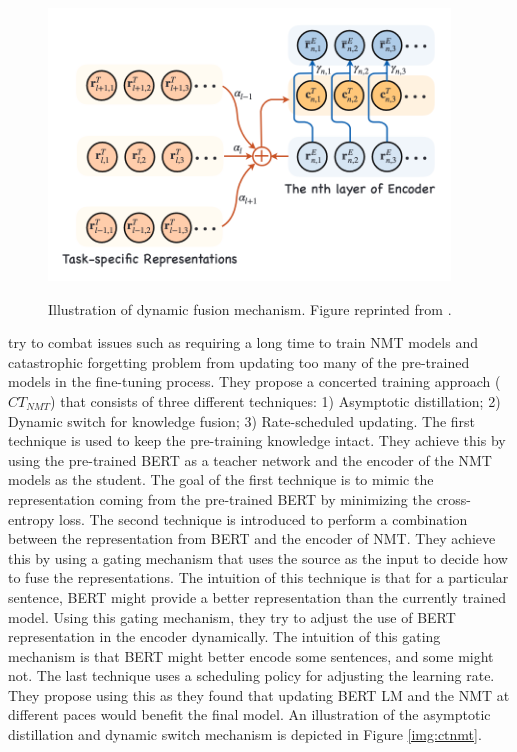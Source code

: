 \begin{figure}[h]
    {\includegraphics[width=0.95\textwidth]{img/dynamic_fusion.png}}
    \centering
    \caption{Illustration of dynamic fusion mechanism. Figure reprinted from \cite{weng2020acquiring}.}
    \label{img:dyn_fn}
\end{figure}

\cite{yang2020towards} try to combat issues such as requiring a long time to train NMT models and catastrophic forgetting problem from updating too many of the pre-trained models in the fine-tuning process. They propose a concerted training approach ($CT_{NMT}$) that consists of three different techniques: 1) Asymptotic distillation; 2) Dynamic switch for knowledge fusion; 3) Rate-scheduled updating. The first technique is used to keep the pre-training knowledge intact. They achieve this by using the pre-trained BERT as a teacher network and the encoder of the NMT models as the student. The goal of the first technique is to mimic the representation coming from the pre-trained BERT by minimizing the cross-entropy loss. The second technique is introduced to perform a combination between the representation from BERT and the encoder of NMT. They achieve this by using a gating mechanism that uses the source as the input to decide how to fuse the representations. The intuition of this technique is that for a particular sentence, BERT might provide a better representation than the currently trained model. Using this gating mechanism, they try to adjust the use of BERT representation in the encoder dynamically. The intuition of this gating mechanism is that BERT might better encode some sentences, and some might not. The last technique uses a scheduling policy for adjusting the learning rate. They propose using this as they found that updating BERT LM and the NMT at different paces would benefit the final model. An illustration of the asymptotic distillation and dynamic switch mechanism is depicted in Figure \ref{img:ctnmt}.

